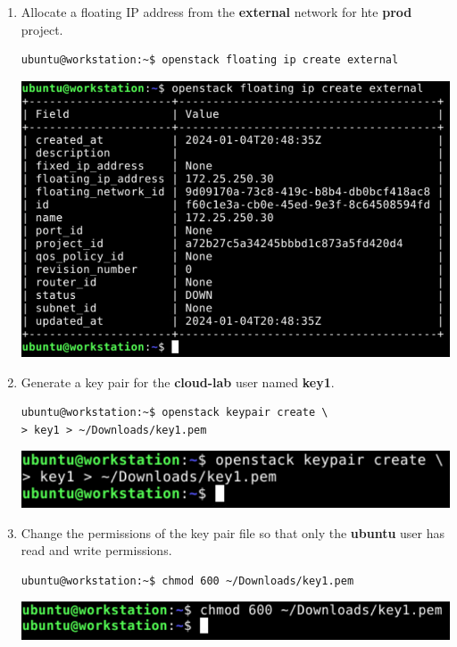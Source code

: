 \documentclass[letterpaper, 12pt]{article}
\begin{document}
\begin{enumerate}
    \item Allocate a floating IP address from the \textbf{external} network for hte \textbf{prod} project.
\begin{lstlisting}
ubuntu@workstation:~$ openstack floating ip create external
\end{lstlisting}

    \begin{center}
        \includegraphics[width=\linewidth]{images/part1/step25.png}
    \end{center}

    \item Generate a key pair for the \textbf{cloud-lab} user named \textbf{key1}.
\begin{lstlisting}
ubuntu@workstation:~$ openstack keypair create \
> key1 > ~/Downloads/key1.pem
\end{lstlisting}

    \begin{center}
        \includegraphics[width=\linewidth]{images/part1/step26.png}
    \end{center}

    \item Change the permissions of the key pair file so that only the \textbf{ubuntu} user has read and write
    permissions.
\begin{lstlisting}
ubuntu@workstation:~$ chmod 600 ~/Downloads/key1.pem
\end{lstlisting}

    \begin{center}
        \includegraphics[width=\linewidth]{images/part1/step27.png}
    \end{center}


\end{enumerate}
\end{document}
